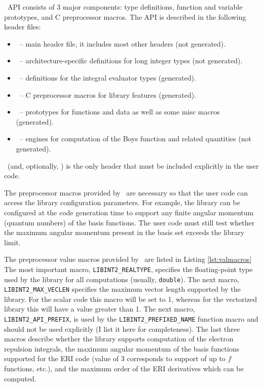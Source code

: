 \documentclass[10pt]{article}
\begin{document}
\LIBINT\ API consists of 3 major components: type definitions, function and variable prototypes, and C preprocessor macros.
The API is described in the following header files:
\begin{itemize}
\item \libinth\ -- main header file, it includes most other headers (not generated).
\item \libintinttypesh\ -- architecture-specific definitions for long integer types (not generated).
\item \libinttypesh\ -- definitions for the integral evaluator types (generated).
\item \libintparamsh\ -- C preprocessor macros for library features (generated).
\item \libintifaceh\ -- prototypes for functions and data as well as some misc macros (generated).
\item \boysh\ -- engines for computation of the Boys function and related quantities (not generated).
\end{itemize}
\libinth\ (and, optionally, \boysh) is the only header that must be included explicitly in the user code.

The preprocessor macros provided by \libinth\ are necessary so that the user code can
access the library configuration parameters. For example, the library can be configured at the code generation time
to support any finite angular momentum (quantum numbers) of the basis functions. The user code must still
test whether the maximum angular momentum present in the basis set exceeds the library limit.

The preprocessor value macros provided by \libinth\ are listed in Listing
\ref{lst:valmacros}
The most important macro, {\tt LIBINT2\_REALTYPE}, specifies the floating-point type
used by the library for all computations (usually, {\tt double}).
The next macro, {\tt LIBINT2\_MAX\_VECLEN} specifies the maximum vector length supported by the library. For the scalar code
this macro will be set to 1, whereas for the vectorized library this will have a value greater than
1.
The next macro, {\tt LIBINT2\_API\_PREFIX}, is used by the {\tt LIBINT2\_PREFIXED\_NAME} function macro and should not be
used explicitly (I list it here for completeness).
The last three macros describe whether the library supports computation of the electron repulsion integrals,
the maximum angular momentum of the basis functions supported for the ERI code (value of 3 corresponds to support
of up to $f$ functions, etc.), and the maximum order of the
ERI derivatives which can be computed.
\end{document}
